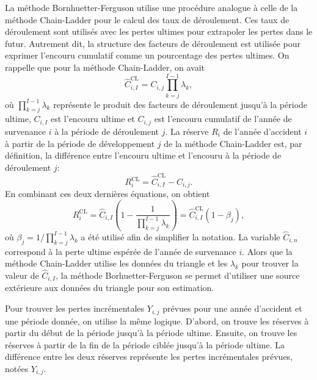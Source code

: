 La méthode Bornhuetter-Ferguson utilise une procédure analogue à celle
de la méthode Chain-Ladder pour le calcul des taux de déroulement. Ces
taux de déroulement sont utilisés avec les pertes ultimes pour
extrapoler les pertes dans le futur. Autrement dit, la structure des
facteurs de déroulement est utilisée pour exprimer l'encouru cumulatif
comme un pourcentage des pertes ultimes. On rappelle que pour la
méthode Chain-Ladder, on avait
\begin{equation*}
  \hat{C}_{i, I}^{\text{CL}} = C_{i, j} \prod_{k = j}^{I-1} \lambda_k,
\end{equation*}
où $\prod_{k=j}^{I-1} \lambda_k $ représente le produit des facteurs
de déroulement jusqu'à la période ultime, $C_{i, I}$ est l'encouru
ultime et $C_{i, j}$ est l'encouru cumulatif de l'année de survenance
$i$ à la période de déroulement $j$. La réserve $R_i$ de l'année
d'accident $i$ à partir de la période de développement $j$ de la
méthode Chain-Ladder est, par définition, la différence entre
l'encouru ultime et l'encouru à la période de déroulement $j$:
\begin{equation*}
  R_i^{\text{CL}} = \hat{C}_{i, I}^{\text{CL}} - C_{i, j}.
\end{equation*}
En combinant ces deux dernières équations, on obtient
\begin{equation*}
  R_i^{\text{CL}} = \hat{C}_{i, I}
  \left(
    1 - \frac{1}{\prod_{k=j}^{I-1} \lambda_k}
  \right) =  \hat{C}_{i, I}^{\text{CL}} (1 - \beta_j),
\end{equation*}
où $\beta_j = 1/\prod_{k=j}^{I-1} \lambda_k$ a été utilisé afin
de simplifier la notation. La variable $\hat{C}_{i,n}$ correspond à la
perte ultime espérée de l'année de survenance $i$. Alors que la
méthode Chain-Ladder utilise les données du triangle et les
$\lambda_k$ pour trouver la valeur de $\hat{C}_{i,I}$, la méthode
Borhuetter-Ferguson se permet d'utiliser une source extérieure aux
données du triangle pour son estimation.

Pour trouver les pertes incrémentales $Y_{i,j}$ prévues pour une année
d'accident et une période donnée, on utilise la même logique. D'abord,
on trouve les réserves à partir du début de la période jusqu'à la
période ultime. Ensuite, on trouve les réserves à partir de la fin de
la période ciblée jusqu'à la période ultime. La différence entre les
deux réserves représente les pertes incrémentales prévues, notées
$Y_{i,j}$.

